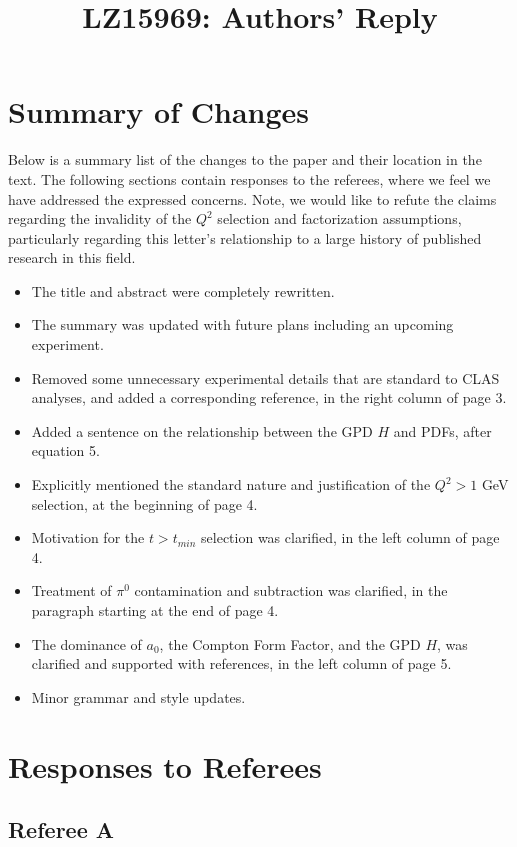 \documentclass{article}
\title{LZ15969:  Authors' Reply}
\begin{document}
\maketitle

\section{Summary of Changes}
Below is a summary list of the changes to the paper and their location in the text.  The following sections contain responses to the referees, where we feel we have addressed the expressed concerns.  Note, we would like to refute the claims regarding the invalidity of the $Q^2$ selection and factorization assumptions, particularly regarding this letter's relationship to a large history of published research in this field.

\begin{itemize}
    \item{The title and abstract were completely rewritten.}
    \item{The summary was updated with future plans including an upcoming experiment.}
    \item{Removed some unnecessary experimental details that are standard to CLAS analyses, and added a corresponding reference, in the right column of page 3.}
    \item{Added a sentence on the relationship between the GPD $H$ and PDFs, after equation 5.}
    \item{Explicitly mentioned the standard nature and justification of the $Q^2>1$ GeV selection, at the beginning of page 4.}
    \item{Motivation for the $t>t_{min}$ selection was clarified, in the left column of page 4.}
    \item{Treatment of $\pi^0$ contamination and subtraction was clarified, in the paragraph starting at the end of page 4.}
    \item{The dominance of $a_0$, the Compton Form Factor, and the GPD $H$, was clarified and supported with references, in the left column of page 5.}
    \item{Minor grammar and style updates.}
\end{itemize}

\section{Responses to Referees}

\subsection{Referee A}
\end{document}
